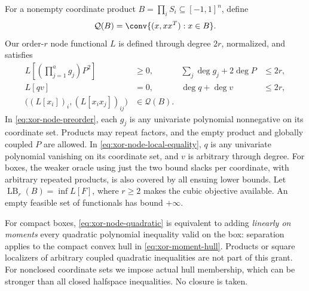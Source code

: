 For a nonempty coordinate product $B=\prod_i S_i\subseteq[-1,1]^n$, define
\begin{equation}\label{eq:xor-moment-hull}
 \mathcal Q(B)=\conv\{(x,xx^T):x\in B\}.
\end{equation}
Our order-$r$ node functional $L$ is defined through degree $2r$, normalized,
and satisfies
\begin{align}
 L\left[\left(\prod_{j=1}^a g_j\right)P^2\right]&\ge0,
 &\sum_j\deg g_j+2\deg P&\le2r,\label{eq:xor-node-preorder}\\
 L[qv]&=0,&\deg q+\deg v&\le2r,\label{eq:xor-node-local-equality}\\
 \bigl((L[x_i])_i,(L[x_ix_j])_{ij}\bigr)&\in\mathcal Q(B).
 &&\label{eq:xor-node-quadratic}
\end{align}
In \eqref{eq:xor-node-preorder}, each $g_j$ is any univariate polynomial
nonnegative on its coordinate set. Products may repeat factors, and the
empty product and globally coupled $P$ are allowed. In
\eqref{eq:xor-node-local-equality}, $q$ is any univariate polynomial
vanishing on its coordinate set, and $v$ is arbitrary through degree.
For boxes, the weaker oracle using just the two bound slacks per coordinate,
with arbitrary repeated products, is also covered by all ensuing lower
bounds. Let $\operatorname{LB}_r(B)=\inf L[F]$, where $r\ge2$ makes the
cubic objective available. An empty feasible set of functionals has bound
$+\infty$.

For compact boxes, \eqref{eq:xor-node-quadratic} is equivalent to adding
\emph{linearly on moments} every quadratic polynomial inequality valid
on the box: separation applies to the compact convex hull in
\eqref{eq:xor-moment-hull}. Products or square localizers of arbitrary
coupled quadratic inequalities are not part of this grant. For nonclosed
coordinate sets we impose actual hull membership, which can be stronger
than all closed halfspace inequalities. No closure is taken.

